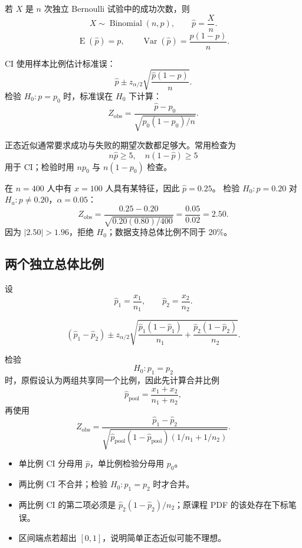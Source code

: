 \documentclass[11pt,a4paper]{article}
\newcommand{\E}{\operatorname{E}}
\newcommand{\Var}{\operatorname{Var}}
\newcommand{\1}{\mathbf{1}}
\begin{document}
若 $X$ 是 $n$ 次独立 Bernoulli 试验中的成功次数，则
\[
  X\sim\operatorname{Binomial}(n,p),
  \qquad
  \hat p=\frac{X}{n}.
\]
\[
  \E(\hat p)=p,\qquad
  \Var(\hat p)=\frac{p(1-p)}{n}.
\]

\begin{memorybox}
CI 使用样本比例估计标准误：
\[
  \boxed{
  \hat p
  \pm
  z_{\alpha/2}
  \sqrt{\frac{\hat p(1-\hat p)}{n}}.
  }
\]
检验 $H_0:p=p_0$ 时，标准误在 $H_0$ 下计算：
\[
  \boxed{
  Z_{\mathrm{obs}}
  =
  \frac{\hat p-p_0}
  {\sqrt{p_0(1-p_0)/n}}.
  }
\]
\end{memorybox}

正态近似通常要求成功与失败的期望次数都足够大。常用检查为
\[
  n\hat p\ge 5,\quad n(1-\hat p)\ge 5
\]
用于 CI；检验时用 $np_0$ 与 $n(1-p_0)$ 检查。

\begin{examplebox}[单总体比例]
在 $n=400$ 人中有 $x=100$ 人具有某特征，因此 $\hat p=0.25$。
检验 $H_0:p=0.20$ 对 $H_a:p\ne0.20$，$\alpha=0.05$：
\[
  Z_{\mathrm{obs}}
  =
  \frac{0.25-0.20}{\sqrt{0.20(0.80)/400}}
  =
  \frac{0.05}{0.02}
  =
  2.50.
\]
因为 $|2.50|>1.96$，拒绝 $H_0$；数据支持总体比例不同于 20\%。
\end{examplebox}

\subsection{两个独立总体比例}

设
\[
  \hat p_1=\frac{x_1}{n_1},
  \qquad
  \hat p_2=\frac{x_2}{n_2}.
\]

\begin{memorybox}
\[
  \boxed{
  (\hat p_1-\hat p_2)
  \pm
  z_{\alpha/2}
  \sqrt{
  \frac{\hat p_1(1-\hat p_1)}{n_1}
  +
  \frac{\hat p_2(1-\hat p_2)}{n_2}
  }.
  }
\]
\end{memorybox}

检验
\[
  H_0:p_1=p_2
\]
时，原假设认为两组共享同一个比例，因此先计算合并比例
\[
  \hat p_{\mathrm{pool}}
  =
  \frac{x_1+x_2}{n_1+n_2},
\]
再使用
\[
  \boxed{
  Z_{\mathrm{obs}}
  =
  \frac{\hat p_1-\hat p_2}
  {\sqrt{
  \hat p_{\mathrm{pool}}(1-\hat p_{\mathrm{pool}})
  \left(1/n_1+1/n_2\right)
  }}.
  }
\]

\begin{warnbox}[比例推断最常见陷阱]
\begin{itemize}
  \item 单比例 CI 分母用 $\hat p$，单比例检验分母用 $p_0$。
  \item 两比例 CI 不合并；检验 $H_0:p_1=p_2$ 时才合并。
  \item 两比例 CI 的第二项必须是
  $\hat p_2(1-\hat p_2)/n_2$；原课程 PDF 的该处存在下标笔误。
  \item 区间端点若超出 $[0,1]$，说明简单正态近似可能不理想。
\end{itemize}
\end{warnbox}
\end{document}
